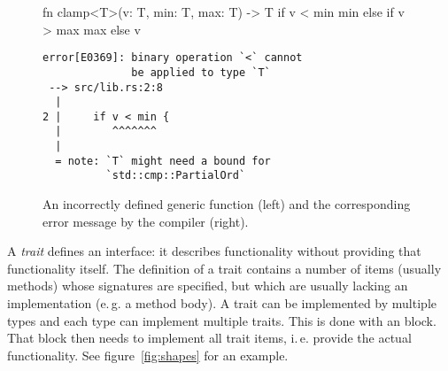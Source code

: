 \vspace{7mm}
\begin{figure}[h]
  \centering
  \begin{minipage}[t]{.55\textwidth}
    \begin{rustcode}
      fn clamp<T>(v: T, min: T, max: T) -> T {
          if v < min {
              min
          } else if v > max {
              max
          } else {
              v
          }
      }
    \end{rustcode}
  \end{minipage}
  \hspace{2mm}
  \begin{minipage}[t]{.42\textwidth}
    \footnotesize
    \vspace{3mm}
    \begin{verbatim}
error[E0369]: binary operation `<` cannot
              be applied to type `T`
 --> src/lib.rs:2:8
  |
2 |     if v < min {
  |        ^^^^^^^
  |
  = note: `T` might need a bound for
          `std::cmp::PartialOrd`
    \end{verbatim}
  \end{minipage}
  \caption{
    An incorrectly defined generic function (left) and the corresponding error message by the compiler (right).
  }
  \label{fig:clamp}
\end{figure}
\vspace{7mm}

A \emph{trait} defines an interface: it describes functionality without providing that functionality itself.
The definition of a trait contains a number of items (usually methods) whose signatures are specified, but which are usually lacking an implementation (e.\,g. a method body).
A trait can be implemented by multiple types and each type can implement multiple traits.
This is done with an  block.
That block then needs to implement all trait items, i.\,e. provide the actual functionality.
See figure~\ref{fig:shapes} for an example.


